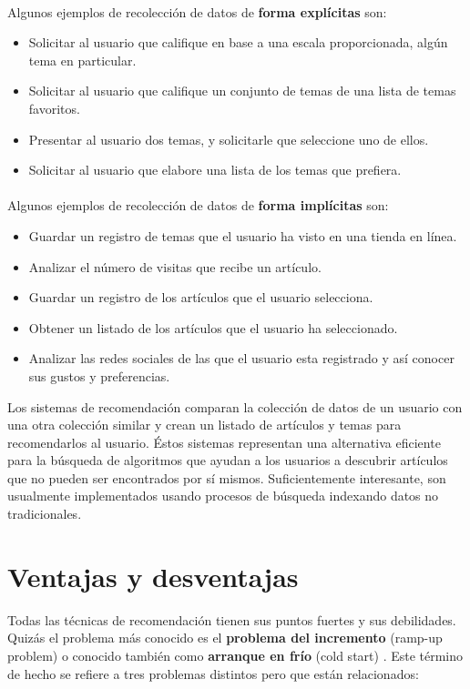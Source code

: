 \documentclass[12pt,letterpaper,oneside] {memoir}
\begin{document}
\paragraph{}
Algunos ejemplos de recolección de datos de \textbf{forma explícitas} son:
\begin{itemize}
	\item Solicitar al usuario que califique en base a una escala proporcionada, algún tema en particular.
	\item Solicitar al usuario que califique un conjunto de temas de una lista de temas favoritos.
	\item Presentar al usuario dos temas, y solicitarle que seleccione uno de ellos.
	\item Solicitar al usuario que elabore una lista de los temas que prefiera. 
\end{itemize}
\paragraph{}
Algunos ejemplos de recolección de datos de \textbf{forma implícitas} son:
\begin{itemize}
	\item Guardar un registro de temas que el usuario ha visto en una tienda en línea.
	\item Analizar el número de visitas que recibe un artículo.
	\item Guardar un registro de los artículos que el usuario selecciona.
	\item Obtener un listado de los artículos que el usuario ha seleccionado.
	\item Analizar las redes sociales de las que el usuario esta registrado y así conocer sus gustos y preferencias.
\end{itemize}

Los sistemas de recomendación comparan la colección de datos de un usuario con una otra colección similar y crean un listado de artículos y temas para recomendarlos al usuario. Éstos sistemas representan una alternativa eficiente para la búsqueda de algoritmos que ayudan a los usuarios a descubrir artículos que no pueden ser encontrados por sí mismos. Suficientemente interesante, son usualmente implementados usando procesos de búsqueda indexando datos no tradicionales. 

\section{Ventajas y desventajas}
Todas las técnicas de recomendación tienen sus puntos fuertes y sus debilidades. Quizás el problema más conocido es el \textbf{problema del incremento} (ramp-up problem) o conocido también como \textbf{arranque en frío} (cold start) \citep{Ahn2008, Burke2002}. Este término de hecho se refiere a tres problemas distintos pero que están relacionados:
\end{document}
